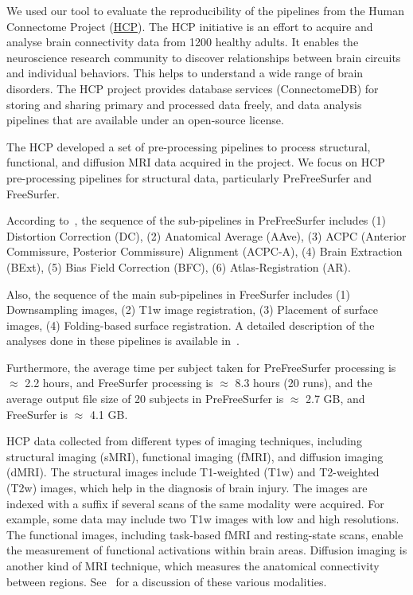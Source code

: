 \documentclass[a4paper,num-refs]{oup-contemporary}
\begin{document}
We used our tool to evaluate the reproducibility of the pipelines from the Human Connectome 
Project (\href{https://www.humanconnectome.org}{HCP}).
The HCP initiative is an effort to acquire and analyse 
brain connectivity data from 1200 healthy adults.
It enables the neuroscience 
research community to discover relationships between brain circuits and 
individual behaviors. This helps to understand a wide range of brain disorders.
The HCP project provides database services (ConnectomeDB) for storing and 
sharing primary and processed data freely, and data analysis pipelines that 
are available under an open-source license.

The HCP developed a set of pre-processing pipelines to process structural,
functional, and diffusion MRI data acquired in the project. We focus on HCP
pre-processing pipelines for structural data, particularly PreFreeSurfer
and FreeSurfer. 

According to~\cite{glasser2013}, the sequence of the 
sub-pipelines in PreFreeSurfer includes 
(1) Distortion Correction (DC), 
(2) Anatomical Average (AAve), 
(3) ACPC (Anterior Commissure, Posterior Commissure) Alignment (ACPC-A), 
(4) Brain Extraction (BExt), 
(5) Bias Field Correction (BFC), 
(6) Atlas-Registration (AR).

Also, the sequence of the main sub-pipelines in FreeSurfer includes 
(1) Downsampling images, 
(2) T1w image registration, 
(3) Placement of surface images, 
(4) Folding-based surface registration.
A detailed description of the analyses done in these
pipelines is available in~\cite{glasser2013}. 

Furthermore, the average time per subject taken for PreFreeSurfer processing is $\approx$ 2.2 hours, 
and FreeSurfer processing is $\approx$ 8.3 hours (20 runs), 
and the average output file size of 20 subjects in PreFreeSurfer is $\approx$ 2.7 GB, 
and FreeSurfer is $\approx$ 4.1 GB.

HCP data collected from different types of imaging techniques, including 
structural imaging (sMRI), functional imaging (fMRI), and diffusion imaging (dMRI).
The structural images include T1-weighted (T1w) and T2-weighted (T2w) images, which 
help in the diagnosis of brain injury.
The images are indexed with a suffix if several scans of the same modality were acquired.
For example, some data may include two T1w images with low and high resolutions.
The functional images, including task-based fMRI and resting-state scans, 
enable the measurement of functional activations within brain areas. 
Diffusion imaging is another kind of MRI technique, which measures 
the anatomical connectivity between regions.
See~\cite{van2013wu} for a discussion of these various modalities.
\end{document}
